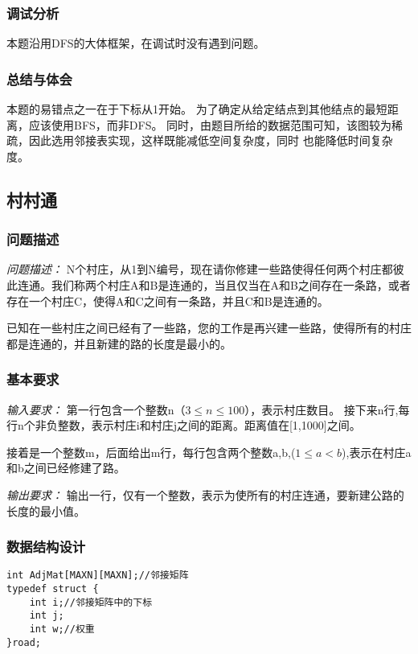 \documentclass[a4paper,11pt]{article}%
\newenvironment{shadedquotation}
 {\begin{shaded*}
  \quoting[leftmargin=0pt, vskip=0pt]
 }
 {\endquoting
 \end{shaded*}
}
\begin{document}
\subsubsection{调试分析}
本题沿用DFS的大体框架，在调试时没有遇到问题。
\subsubsection{总结与体会}
本题的易错点之一在于下标从1开始。
为了确定从给定结点到其他结点的最短距离，应该使用BFS，而非DFS。
同时，由题目所给的数据范围可知，该图较为稀疏，因此选用邻接表实现，这样既能减低空间复杂度，同时
也能降低时间复杂度。
\subsection{村村通}
\subsubsection{问题描述}
\begin{shadedquotation}
    \emph{问题描述：}
    N个村庄，从1到N编号，现在请你修建一些路使得任何两个村庄都彼此连通。我们称两个村庄A和B是连通的，当且仅当在A和B之间存在一条路，或者存在一个村庄C，使得A和C之间有一条路，并且C和B是连通的。

    已知在一些村庄之间已经有了一些路，您的工作是再兴建一些路，使得所有的村庄都是连通的，并且新建的路的长度是最小的。
\end{shadedquotation}
\subsubsection{基本要求}
\begin{shadedquotation}
    \emph{输入要求：}
    第一行包含一个整数n（$3\leq n\leq 100$），表示村庄数目。
接下来n行,每行n个非负整数，表示村庄i和村庄j之间的距离。距离值在[1,1000]之间。

接着是一个整数m，后面给出m行，每行包含两个整数a,b,($1\leq a<b$),表示在村庄a和b之间已经修建了路。 
\end{shadedquotation}
\begin{shadedquotation}
    \emph{输出要求：}
    输出一行，仅有一个整数，表示为使所有的村庄连通，要新建公路的长度的最小值。
\end{shadedquotation}
\subsubsection{数据结构设计}
\begin{lstlisting}[language={[ANSI]C},keywordstyle=\color{blue!70},commentstyle=\color{red!50!green!50!blue!50},frame=shadowbox,
				rulesepcolor=\color{red!20!green!20!blue!20}]
int AdjMat[MAXN][MAXN];//邻接矩阵
typedef struct {
	int i;//邻接矩阵中的下标
	int j;
	int w;//权重
}road;
\end{lstlisting}
\end{document}
